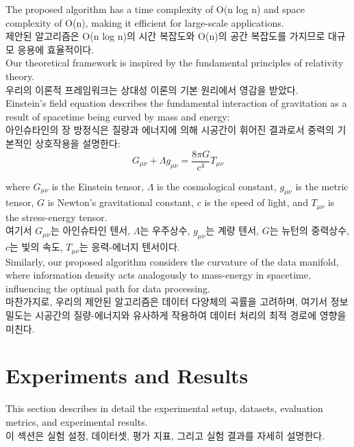 \documentclass[preprint,12pt]{elsarticle}
\begin{document}
The proposed algorithm has a time complexity of O(n log n) and space complexity of O(n), making it efficient for large-scale applications. \\
제안된 알고리즘은 O(n log n)의 시간 복잡도와 O(n)의 공간 복잡도를 가지므로 대규모 응용에 효율적이다. \\

Our theoretical framework is inspired by the fundamental principles of relativity theory. \\
우리의 이론적 프레임워크는 상대성 이론의 기본 원리에서 영감을 받았다. \\

Einstein's field equation describes the fundamental interaction of gravitation as a result of spacetime being curved by mass and energy: \\
아인슈타인의 장 방정식은 질량과 에너지에 의해 시공간이 휘어진 결과로서 중력의 기본적인 상호작용을 설명한다: \\

\begin{equation}
G_{\mu\nu} + \Lambda g_{\mu\nu} = \frac{8\pi G}{c^4} T_{\mu\nu}
\end{equation}

where $G_{\mu\nu}$ is the Einstein tensor, $\Lambda$ is the cosmological constant, $g_{\mu\nu}$ is the metric tensor, $G$ is Newton's gravitational constant, $c$ is the speed of light, and $T_{\mu\nu}$ is the stress-energy tensor. \\
여기서 $G_{\mu\nu}$는 아인슈타인 텐서, $\Lambda$는 우주상수, $g_{\mu\nu}$는 계량 텐서, $G$는 뉴턴의 중력상수, $c$는 빛의 속도, $T_{\mu\nu}$는 응력-에너지 텐서이다. \\

Similarly, our proposed algorithm considers the curvature of the data manifold, where information density acts analogously to mass-energy in spacetime, influencing the optimal path for data processing. \\
마찬가지로, 우리의 제안된 알고리즘은 데이터 다양체의 곡률을 고려하며, 여기서 정보 밀도는 시공간의 질량-에너지와 유사하게 작용하여 데이터 처리의 최적 경로에 영향을 미친다. \\

\section{Experiments and Results}
\label{sec:experiments}

This section describes in detail the experimental setup, datasets, evaluation metrics, and experimental results. \\
이 섹션은 실험 설정, 데이터셋, 평가 지표, 그리고 실험 결과를 자세히 설명한다. \\
\end{document}
